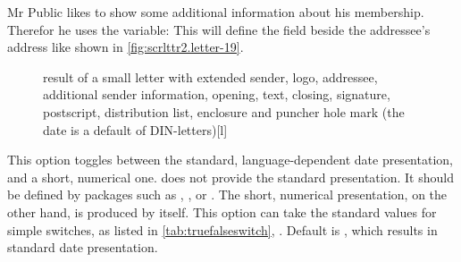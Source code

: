 \begin{Example}
  Mr Public likes to show some additional information about his
  membership. Therefor he uses the  variable:%
  This will define the field beside the addressee's address like shown in
  \autoref{fig:scrlttr2.letter-19}.
  \begin{figure}
    \setcapindent{0pt}%
    \begin{captionbeside}
      {result of a small letter with extended sender, logo,
        addressee, additional sender information, opening, text, closing,
        signature, postscript, distribution list, enclosure and puncher hole
        mark (the date is a default of DIN-letters)}[l]
    \end{captionbeside}
    \label{fig:scrlttr2.letter-19}
  \end{figure}
\end{Example}
%
%
%
%
%
%


\begin{Declaration}
\end{Declaration}
%
This option toggles between the standard, language-dependent
date presentation, and a short, numerical
one. {\KOMAScript} does not provide the standard presentation. It should be
defined by packages such as ,
, or
. The
short, numerical presentation, on the other hand, is produced by
 itself. This option can take the standard values for simple
switches, as listed in \autoref{tab:truefalseswitch},
. Default is , which results in
standard date presentation.

